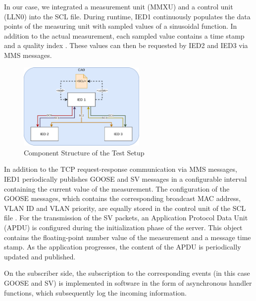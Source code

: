 \documentclass[conference, onecolumn, a4paper]{IEEEtran}
\begin{document}
\smallskip
In our case, we integrated a measurement unit (MMXU) \cite[p. 268]{IEC61850-7-4:2010} and a control unit (LLN0) \cite[p. 164]{IEC61850-7-4:2010} 
into the SCL file. During runtime, IED1 continuously populates the data points of the measuring unit with sampled values of a sinusoidal function. In 
addition to the actual measurement, each sampled value contains a time stamp and a quality index \cite[p. 61ff]{IEC61850-7-3:2010}. These values can 
then be requested by IED2 and IED3 via MMS messages.

\begin{figure}[h]
    \centering
    \includegraphics[width=0.55\textwidth]{images/TestSetupIEDs.png}
    \caption{Component Structure of the Test Setup}
    \label{image:MACsecTestSetup}
\end{figure}

\noindent In addition to the TCP request-response communication via MMS messages, IED1 periodically publishes GOOSE and SV messages in a configurable 
interval containing the current value of the measurement. The configuration of the GOOSE messages, which contains the corresponding broadcast MAC address, 
VLAN ID and VLAN priority, are equally stored in the control unit of the SCL file \cite[p. 189]{IEC61850-8-1:2011}. For the transmission of the SV 
packets, an Application Protocol Data Unit (APDU) is configured during the initialization phase of the server. This object contains the floating-point 
number value of the measurement and a message time stamp. As the application progresses, the content of the APDU is periodically updated and published. 

\smallskip 
On the subscriber side, the subscription to the corresponding events (in this case GOOSE and SV) is implemented in software in the form of asynchronous 
handler functions, which subsequently log the incoming information. 

\end{document}
